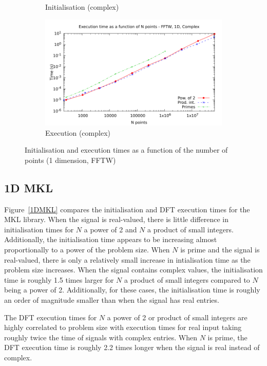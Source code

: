 \documentclass[12pt, a4paper]{article} \setlength{\textheight}{24cm}
\begin{document}
\begin{figure}[htb]
\begin{subfigure}{.5\textwidth}
    \caption{Initialisation (complex)}
    \label{1DFFTWCI}
  \end{subfigure}%
  \begin{subfigure}{.5\textwidth}
    \centering
    \includegraphics[width=.9\linewidth]{graphs/1d-fftw-exec-c.pdf}
    \caption{Execution (complex)}
    \label{1DFFTWC}
  \end{subfigure}
  \caption{Initialisation and execution times as a function of the
    number of points (1 dimension, FFTW)}
  \label{1DFFTW}
\end{figure}

\subsection{1D MKL}\label{Sec:MKL1d}
Figure~\ref{1DMKL} compares the initialisation and DFT execution times
for the MKL library. When the signal is real-valued, there is little
difference in initialisation times for $N$ a power of 2 and $N$ a
product of small integers. Additionally, the initialisation time
appears to be increasing almost proportionally to a power of the
problem size. When $N$ is prime and the signal is real-valued, there
is only a relatively small increase in intialisation time as the
problem size increases. When the signal contains complex values, the
initialisation time is roughly 1.5 times larger for $N$ a product of
small integers compared to $N$ being a power of 2. Additionally, for
these cases, the initialisation time is roughly an order of magnitude
smaller than when the signal has real entries.

The DFT execution times for $N$ a power of 2 or product of small
integers are highly correlated to problem size with execution times
for real input taking roughly twice the time of signals with complex
entries. When $N$ is prime, the DFT execution time is roughly 2.2 times longer
when the signal is real instead of complex.
\end{document}
